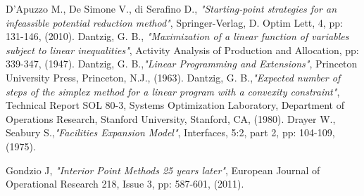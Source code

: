 \documentclass[a4paper,10 pt,titlepage,twoside]{book}
\theoremstyle{plain}
\theoremstyle{definition}
\theoremstyle{remark}
\begin{document}
{{\begin{thebibliography}{9}
	 D'Apuzzo M., De Simone V., di Serafino D., \emph{"Starting-point strategies for an infeassible potential reduction method"}, Springer-Verlag, D. Optim Lett, 4, pp: 131-146, (2010).
	Dantzig, G. B., \emph{"Maximization of a linear function of variables subject to linear
	inequalities"}, Activity Analysis of Production and Allocation, pp: 339-347, (1947).
	Dantzig, G. B.,\emph{\;"Linear Programming and Extensions"}, Princeton University Press, Princeton, N.J., (1963).	
	Dantzig, G. B.,\emph{\;"Expected number of steps of the simplex method for a linear program with a convexity constraint"}, Technical Report SOL 80-3, Systems Optimization Laboratory, Department of Operations Research, Stanford University, Stanford, CA, (1980).
	Drayer W., Seabury S.,\emph{\;"Facilities Expansion Model"}, Interfaces, 5:2, part 2, pp: 104-109, (1975).
	
	
	 Gondzio J, \textit{ "Interior Point Methods 25 years later"}, European Journal of Operational Research 218, Issue 3, pp: 587-601, (2011).	
	

\end{thebibliography}}}
\end{document}
